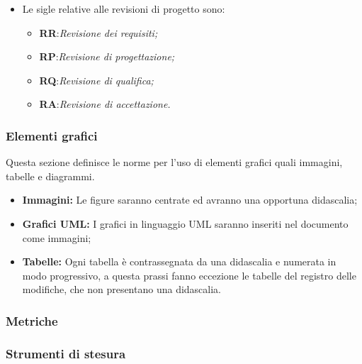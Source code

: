 \begin{itemize}
	\item Le sigle relative alle revisioni di progetto sono:
	
	\begin{itemize}
	
		\item \textbf{RR}:\textit{Revisione dei requisiti;} 	
		
		\item \textbf{RP}:\textit{Revisione di progettazione;} 
		
		\item \textbf{RQ}:\textit{Revisione di qualifica;} 
		
		\item \textbf{RA}:\textit{Revisione di accettazione.} 
	
	\end{itemize}
	
\end{itemize}

\subsubsection{Elementi grafici}

Questa sezione definisce le norme per l'uso di elementi grafici quali immagini, tabelle e diagrammi.

\begin{itemize}

\item \textbf{Immagini:} Le figure saranno centrate ed avranno una opportuna didascalia;

\item \textbf{Grafici UML:} I grafici in linguaggio UML saranno inseriti nel documento come immagini;

\item \textbf{Tabelle:} Ogni tabella è contrassegnata da una didascalia e numerata in modo progressivo, a questa prassi fanno eccezione le tabelle del registro delle modifiche, che non presentano una didascalia.


\end{itemize}

\subsubsection{Metriche}


\subsubsection{Strumenti di stesura}

